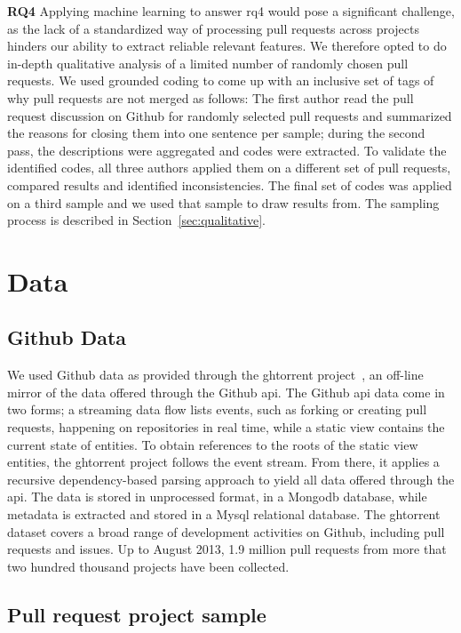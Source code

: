 \documentclass{sig-alternate}
\begin{document}
{\bfseries RQ4} Applying machine learning to answer {\sc rq4} would pose a
significant challenge, as the lack of a standardized way of processing pull
requests across projects hinders our ability to extract reliable relevant
features. We therefore opted to do in-depth qualitative analysis of a limited
number of randomly chosen pull requests. We used grounded coding to come up with
an inclusive set of tags of why pull requests are not merged as follows: The
first author read the pull request discussion on Github for randomly selected
pull requests and summarized the reasons for closing them into one sentence per
sample; during the second pass, the descriptions were aggregated and codes were
extracted. To validate the identified codes, all three authors applied them on a
different set of pull requests, compared results and identified inconsistencies.
The final set of codes was applied on a third sample and we used that sample to
draw results from. The sampling process is described in
Section~\ref{sec:qualitative}.

\section{Data}

\subsection{Github Data}
\label{sec:ghtorrent}
We used Github data as provided through the {\sc ght}orrent project~\cite{G13},
an off-line mirror of the data
offered through the Github {\sc api}. The Github {\sc api} 
data come in two forms; a streaming
data flow lists events, such as forking or creating pull requests, happening on
repositories in real time, while a static view contains the current state of
entities. To obtain references to the roots of the static view entities, the
{\sc ght}orrent project follows the event stream. From there, it applies a
recursive dependency-based parsing approach to yield all data offered through
the {\sc api}. The data is stored in unprocessed format, in a Mongo{\sc db}
database, while metadata is extracted and stored in a My{\sc sql} relational
database. The {\sc ght}orrent dataset covers a broad range of development
activities on Github, including pull requests and issues. Up to August 2013,
1.9 million pull requests from more that two hundred thousand projects
have been collected.

\subsection{Pull request project sample}
\label{sec:expdata} 
\end{document}
